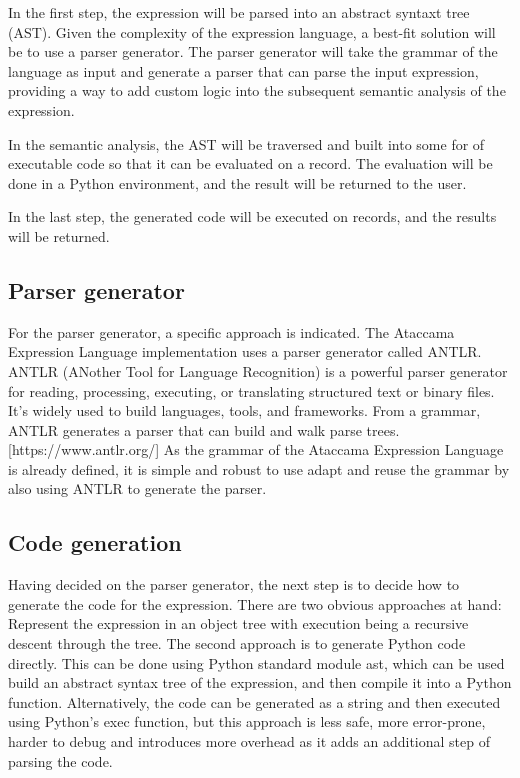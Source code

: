 In the first step, the expression will be parsed into an abstract syntaxt tree (AST). Given the complexity of the expression language, a best-fit solution will be to use a parser generator. The parser generator will take the grammar of the language as input and generate a parser that can parse the input expression, providing a way to add custom logic into the subsequent semantic analysis of the expression.

In the semantic analysis, the AST will be traversed and built into some for of executable code so that it can be evaluated on a record. The evaluation will be done in a Python environment, and the result will be returned to the user.

In the last step, the generated code will be executed on records, and the results will be returned.

\subsection{Parser generator}

For the parser generator, a specific approach is indicated. The Ataccama Expression Language implementation uses a parser generator called ANTLR. ANTLR (ANother Tool for Language Recognition) is a powerful parser generator for reading, processing, executing, or translating structured text or binary files. It's widely used to build languages, tools, and frameworks. From a grammar, ANTLR generates a parser that can build and walk parse trees. [https://www.antlr.org/] As the grammar of the Ataccama Expression Language is already defined, it is simple and robust to use adapt and reuse the grammar by also using ANTLR to generate the parser.

\subsection{Code generation}

Having decided on the parser generator, the next step is to decide how to generate the code for the expression. There are two obvious approaches at hand: Represent the expression in an object tree with execution being a recursive descent through the tree. The second approach is to generate Python code directly. This can be done using Python standard module ast, which can be used build an abstract syntax tree of the expression, and then compile it into a Python function. Alternatively, the code can be generated as a string and then executed using Python's exec function, but this approach is less safe, more error-prone, harder to debug and introduces more overhead as it adds an additional step of parsing the code.

